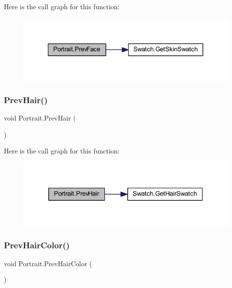Here is the call graph for this function\+:\nopagebreak
\begin{figure}[H]
\begin{center}
\leavevmode
\includegraphics[width=327pt]{class_portrait_aa550ccd7202589090d88e812743da74a_cgraph}
\end{center}
\end{figure}
\mbox{\label{class_portrait_af7fdde58c645c6e4fa5195ed3547b3d9}} 
\subsubsection{\texorpdfstring{PrevHair()}{PrevHair()}}
{\footnotesize\ttfamily void Portrait.\+Prev\+Hair (\begin{DoxyParamCaption}{ }\end{DoxyParamCaption})}

Here is the call graph for this function\+:\nopagebreak
\begin{figure}[H]
\begin{center}
\leavevmode
\includegraphics[width=320pt]{class_portrait_af7fdde58c645c6e4fa5195ed3547b3d9_cgraph}
\end{center}
\end{figure}
\mbox{\label{class_portrait_a29b9670f2b653ffe43cf81e94e90062a}} 
\subsubsection{\texorpdfstring{PrevHairColor()}{PrevHairColor()}}
{\footnotesize\ttfamily void Portrait.\+Prev\+Hair\+Color (\begin{DoxyParamCaption}{ }\end{DoxyParamCaption})}

